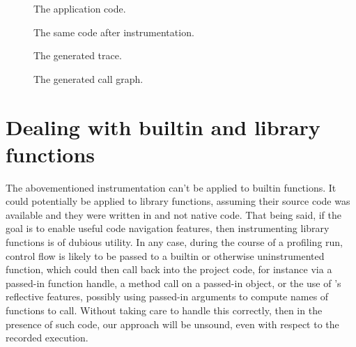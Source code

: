 \begin{figure}[htbp]
\begin{minipage}{\linewidth}
  
\end{minipage}
\begin{minipage}{\linewidth}
  
\end{minipage}
\caption{The application code.}
\label{Fig:CallgraphBefore}
\end{figure}

\begin{figure}[htbp]
\begin{minipage}{\linewidth}
  
\end{minipage}
\begin{minipage}{\linewidth}
  
\end{minipage}
\caption{The same code after instrumentation.}
\label{Fig:CallgraphAfter}
\end{figure}

\begin{figure}[htbp]

\caption{The generated trace.}
\label{Fig:CallgraphTrace}
\end{figure}

\begin{figure}[htbp]

\caption{The generated call graph.}
\label{Fig:Callgraph}
\end{figure}

\section{Dealing with builtin and library functions} \label{sec:CallgraphBuiltins}

The abovementioned instrumentation can't be applied to \matlab builtin
functions. It could potentially be applied to library functions, assuming their
source code was available and they were written in \matlab and not native code.
That being said, if the goal is to enable useful code navigation features, then
instrumenting library functions is of dubious utility. In any case, during the
course of a profiling run, control flow is likely to be passed to a builtin or
otherwise uninstrumented function, which could then call back into the project
code, for instance via a passed-in function handle, a method call on a
passed-in object, or the use of \matlab's reflective features, possibly using
passed-in arguments to compute names of functions to call. Without taking
care to handle this correctly, then in the presence of such code, our approach
will be unsound, even with respect to the recorded execution.

